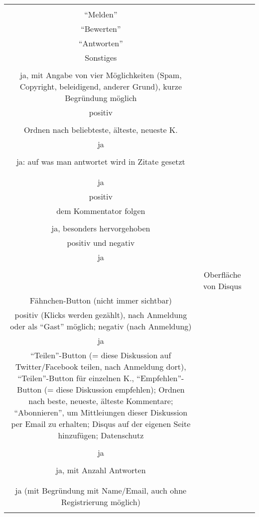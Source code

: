 \begin{landscape}
\begin{tabular}{ccc}
{{		
Funktionen im Kommentar	\\
``Melden''\\
``Bewerten''\\
``Antworten''\\
Sonstiges\\
&		%
		\\
		ja, mit Angabe von vier Möglichkeiten (Spam, Copyright, beleidigend, anderer Grund), kurze Begründung möglich\\
		positiv\\
		\\
		Ordnen nach beliebteste, älteste, neueste K.
		&
		\\
		ja\\
		\\
		ja: auf was man antwortet wird in Zitate gesetzt\\
		\\
		&
		\\
		ja\\
		positiv\\
		dem Kommentator folgen\\
		&
		\\
		ja, besonders hervorgehoben\\
		positiv und negativ\\
		ja\\
		\\
		&
		Oberfläche von Disqus\\
		Fähnchen-Button (nicht immer sichtbar)\\
		positiv (Klicks werden gezählt), nach Anmeldung oder als ``Gast'' möglich; negativ (nach Anmeldung)\\
		ja\\
		``Teilen''-Button (= diese Diskussion auf Twitter/Facebook teilen, nach Anmeldung dort), ``Teilen''-Button für einzelnen K., 		``Empfehlen''-Button (= diese Diskussion empfehlen); Ordnen nach beste, neueste, älteste Kommentare; ``Abonnieren'', um Mittleiungen dieser Diskussion per Email zu erhalten; Disqus auf der eigenen Seite hinzufügen; Datenschutz\\
		&
		\\
		ja\\
		\\
		ja, mit Anzahl Antworten\\
		\\
		&
		\\
		ja (mit Begründung mit Name/Email, auch ohne Registrierung möglich)\\
}}
\end{tabular}
\end{landscape}
